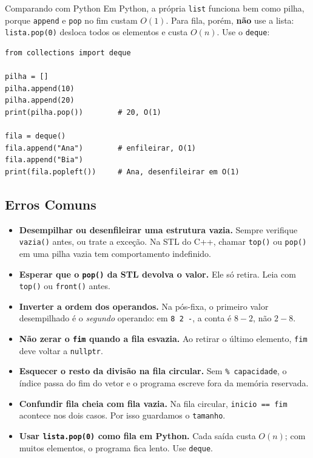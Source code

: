 \begin{destaque}{Comparando com Python}
Em Python, a própria \texttt{list} funciona bem como pilha, porque \texttt{append} e \texttt{pop} no fim custam $O(1)$. Para fila, porém, \textbf{não} use a lista: \texttt{lista.pop(0)} desloca todos os elementos e custa $O(n)$. Use o \texttt{deque}:

\begin{codigo}
\begin{Verbatim}[breaklines=true, breaksymbolleft={}, fontsize=\footnotesize]
from collections import deque

pilha = []
pilha.append(10)
pilha.append(20)
print(pilha.pop())        # 20, O(1)

fila = deque()
fila.append("Ana")        # enfileirar, O(1)
fila.append("Bia")
print(fila.popleft())     # Ana, desenfileirar em O(1)
\end{Verbatim}
\end{codigo}
\end{destaque}

\subsection{Erros Comuns}

\begin{itemize}
  \item \textbf{Desempilhar ou desenfileirar uma estrutura vazia.} Sempre verifique \texttt{vazia()} antes, ou trate a exceção. Na STL do C++, chamar \texttt{top()} ou \texttt{pop()} em uma pilha vazia tem comportamento indefinido.
  \item \textbf{Esperar que o \texttt{pop()} da STL devolva o valor.} Ele só retira. Leia com \texttt{top()} ou \texttt{front()} antes.
  \item \textbf{Inverter a ordem dos operandos.} Na pós-fixa, o primeiro valor desempilhado é o \textit{segundo} operando: em \texttt{8 2 -}, a conta é $8 - 2$, não $2 - 8$.
  \item \textbf{Não zerar o \texttt{fim} quando a fila esvazia.} Ao retirar o último elemento, \texttt{fim} deve voltar a \texttt{nullptr}.
  \item \textbf{Esquecer o resto da divisão na fila circular.} Sem \texttt{\% capacidade}, o índice passa do fim do vetor e o programa escreve fora da memória reservada.
  \item \textbf{Confundir fila cheia com fila vazia.} Na fila circular, \texttt{inicio == fim} acontece nos dois casos. Por isso guardamos o \texttt{tamanho}.
  \item \textbf{Usar \texttt{lista.pop(0)} como fila em Python.} Cada saída custa $O(n)$; com muitos elementos, o programa fica lento. Use \texttt{deque}.
\end{itemize}

